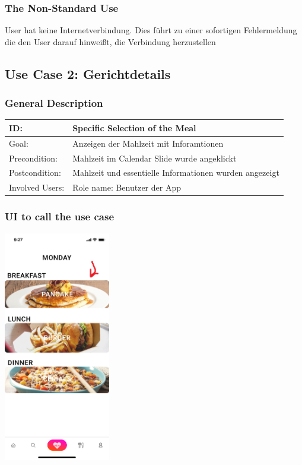 \documentclass[12pt]{article}
\theoremstyle{definition}
\begin{document}
\subsubsection{The Non-Standard Use}
User hat keine Internetverbindung. Dies führt zu einer sofortigen Fehlermeldung die den User darauf hinweißt, die Verbindung herzustellen 



\pagebreak
\subsection{Use Case 2: Gerichtdetails}
\subsubsection{General Description}

\begin{tabular}{|p{.2\linewidth}|p{.65\linewidth}|}
\hline 
ID: & Specific Selection of the Meal \\ \hline
Goal: & Anzeigen der Mahlzeit mit Inforamtionen \\ \hline
Precondition: & Mahlzeit im Calendar Slide wurde angeklickt \\ \hline
Postcondition: & Mahlzeit und essentielle Informationen wurden angezeigt \\ \hline
Involved Users: &Role name: Benutzer der App \\ \hline
\end{tabular}

\subsubsection{UI to call the use case}

\begin{center}
    \includegraphics[width=0.35\textwidth]{res/images/MenueClick.png}
\end{center}
\end{document}
